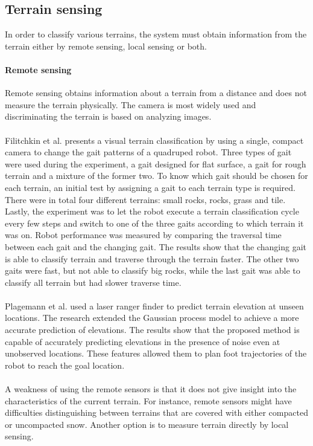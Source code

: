 \documentclass[USenglish]{ifimaster}  %
\begin{document}
		
\subsection{Terrain sensing}
In order to classify various terrains, the system must obtain information from the terrain either by remote sensing, local sensing or both.
	
\paragraph{Remote sensing}
Remote sensing obtains information about a terrain from a distance and does not measure the terrain physically. The camera is most widely used and discriminating the terrain is based on analyzing images.
\\
\\ 
Filitchkin et al. \cite{littleDog} presents a visual terrain classification by using a single, compact camera to change the gait patterns of a quadruped robot. Three types of gait were used during the experiment, a gait designed for flat surface, a gait for rough terrain and a mixture of the former two. To know which gait should be chosen for each terrain, an initial test by assigning a gait to each terrain type is required. There were in total four different terrains: small rocks, rocks, grass and tile. Lastly, the experiment was to let the robot execute a terrain classification cycle every few steps and switch to one of the three gaits according to which terrain it was on. Robot performance was measured by comparing the traversal time between each gait and the changing gait. The results show that the changing gait is able to classify terrain and traverse through the terrain faster. The other two gaits were fast, but not able to classify big rocks, while the last gait was able to classify all terrain but had slower traverse time.
\\
\\
Plagemann et al. \cite{4651026} used a laser ranger finder to predict terrain elevation at unseen locations. The research extended the Gaussian process model to achieve a more accurate prediction of elevations. The results show that the proposed method is capable of accurately predicting elevations in the presence of noise even at unobserved locations. These features allowed them to plan foot trajectories of the robot to reach the goal location.  
\\
\\
A weakness of using the remote sensors is that it does not give insight into the characteristics of the current terrain. For instance, remote sensors might have difficulties distinguishing between terrains that are covered with either compacted or uncompacted snow. Another option is to measure terrain directly by local sensing.
	
\end{document}
